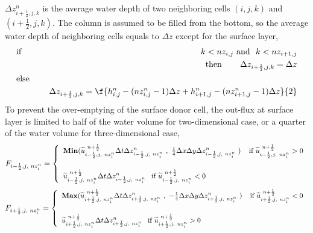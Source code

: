 $\Delta z_{i+ \frac{1}{2},j,k}^n$ is the average water depth of two
neighboring cells $(i,j,k)$ and $(i+ \frac{1}{2},j,k)$. The column is assumed to be filled from the bottom, so the average water depth of neighboring cells equals to $\Delta z$ except for the surface layer,
\begin{eqnarray*}
 &\textrm{if}\hspace{0.1in}&  k< nz_{i,j} \ \textrm{and} \ \ k< nz_{i+1,j} \nonumber \\
 &\hspace{0.4in}&\textrm{then} \hspace{0.3in} \Delta z_{i+ \frac{1}{2},j,k}=\Delta z \nonumber \\
 &\textrm{else}& \nonumber \\
 &\hspace{0.4in}& \Delta z_{i+ \frac{1}{2},j,k} =\f{h_{i,j}^n-(nz_{i,j}^n-1)\Delta z +h_{i+1,j}^n-(nz_{i+1,j}^n-1)\Delta z}{2}
\end{eqnarray*}
To prevent the over-emptying of the surface donor cell, the
out-flux at surface layer is limited to half of the water volume for two-dimensional case, or a quarter of the water volume for three-dimensional case,
\begin{equation}
\small
F_{i- \frac{1}{2} , j, \ nz^n_i}=\left\{
\begin{array}{ll}
\mathbf{Min}( \widetilde{u}_{i- \frac{1}{2},j,\ nz_i^n}^{\ n + \frac{1}{2}}
\Delta t\Delta z_{i- \frac{1}{2},j,\ nz_i^n}^n  \ , \ \frac{1}{4}
\Delta x \Delta y \Delta z_{i- \frac{1}{2},j,\ nz_i^n}^n \ )
\hspace{0.1in} \ \textrm{if} \ \widetilde{u}_{i- \frac{1}{2} ,j,\ nz_i^n}^{\ n
+ \frac{1}{2}} >0 \vspace{0.2in} \\
\widetilde{u}_{i- \frac{1}{2},j ,\ nz_i^n}^{\ n + \frac{1}{2}}  \Delta t\Delta z_{i- \frac{1}{2},j,\ nz_i^n}^n \hspace{0.1in} \textrm{if} \ \widetilde{u}_{i- \frac{1}{2},j,\ nz_i^n}^{\ n + \frac{1}{2}} <0 \\
\end{array}\right.
\end{equation}
\begin{equation}
\small
F_{i+ \frac{1}{2},j, \ nz^n_i}=\left\{
\begin{array}{ll}
\mathbf{Max} ( \widetilde{u}_{i+ \frac{1}{2},j,\ nz_i^n}^{\ n +
\frac{1}{2}}  \Delta t\Delta z_{i+ \frac{1}{2},j,\ nz_i^n}^n \ , \
-\frac{1}{4} \Delta x \Delta y \Delta z_{i+ \frac{1}{2},j,\
nz_i^n}^n \ ) \hspace{0.1in} \ \textrm{if} \ \widetilde{u}_{i+ \frac{1}{2},j,\ nz_i^n}^{\ n + \frac{1}{2}} <0 \vspace{0.2in} \\
\widetilde{u}_{i+ \frac{1}{2},j,\ nz_i^n}^{\ n + \frac{1}{2}}  \Delta t \Delta z_{i+ \frac{1}{2},j,\ nz_i^n}^n \hspace{0.1in} \textrm{if} \ \widetilde{u}_{i+ \frac{1}{2},j,\ nz_i^n}^{\ n + \frac{1}{2}} >0 \\
\end{array}\right.
\end{equation}
